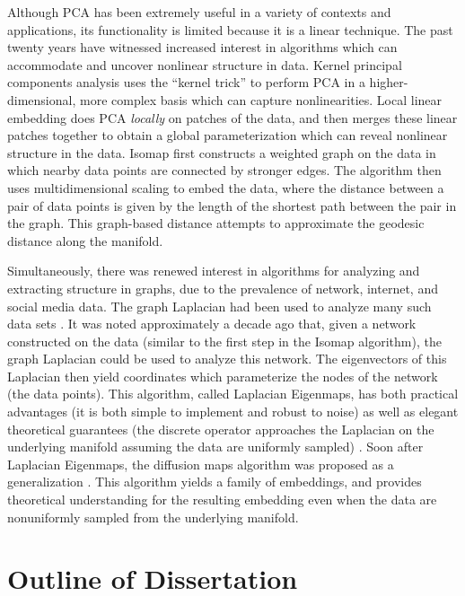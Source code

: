 Although PCA has been extremely useful in a variety of contexts and applications, its functionality is limited because it is a linear technique. 
%
The past twenty years have witnessed increased interest in algorithms which can accommodate and uncover nonlinear structure in data.
%
Kernel principal components analysis \cite{scholkopf1997kernel} uses the ``kernel trick'' to perform PCA in a higher-dimensional, more complex basis which can capture nonlinearities. 
%
Local linear embedding \cite{roweis2000nonlinear} does PCA {\em locally} on patches of the data, and then merges these linear patches together to obtain a global parameterization which can reveal nonlinear structure in the data. 
%
Isomap \cite{tenenbaum2000global} first constructs a weighted graph on the data in which nearby data points are connected by stronger edges.
%
The algorithm then uses multidimensional scaling \cite{joseph1978multidimensional} to embed the data, where the distance between a pair of data points is given by the length of the shortest path between the pair in the graph. 
%
This graph-based distance attempts to approximate the geodesic distance along the manifold. 

Simultaneously, there was renewed interest in algorithms for analyzing and extracting structure in graphs, due to the prevalence of network, internet, and social media data. 
%
The graph Laplacian had been used to analyze many such data sets \cite{shi2000normalized, ng2002spectral}. 
%
It was noted approximately a decade ago that, given a network constructed on the data (similar to the first step in the Isomap algorithm), the graph Laplacian could be used to analyze this network. 
%
The eigenvectors of this Laplacian then yield coordinates which parameterize the nodes of the network (the data points). 
%
This algorithm, called Laplacian Eigenmaps, has both practical advantages (it is both simple to implement and robust to noise) as well as elegant theoretical guarantees (the discrete operator approaches the Laplacian on the underlying manifold assuming the data are uniformly sampled) \cite{Belkin2003}. 
%
Soon after Laplacian Eigenmaps, the diffusion maps algorithm was proposed as a generalization \cite{coifman2005geometric, coifman2006geometric}. 
%
This algorithm yields a family of embeddings, and provides theoretical understanding for the resulting embedding even when the data are nonuniformly sampled from the underlying manifold. 


\section{Outline of Dissertation}

